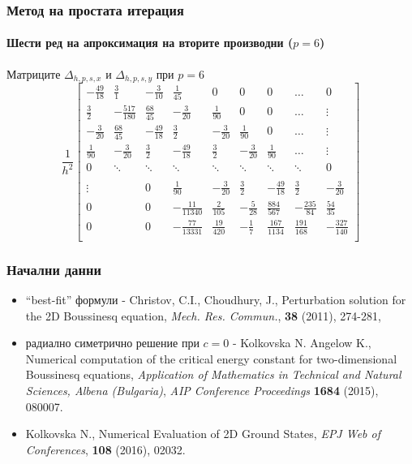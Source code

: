\documentclass{beamer}
\begin{document}
\begin{frame}
\frametitle{Метод на простата итерация}
\framesubtitle{Шести ред на апроксимация на вторите производни ($p=6$) }
Матриците $\Delta_{h,p,s,x}$ и $\Delta_{h,p,s,y}$ при $p=6$
\[
\frac{1}{h^2}
\begin{bmatrix}
   -\frac{49}{18}		& \frac{3}{1}			&   -\frac{3}{10}		& \frac{1}{45}    		 &  0					& 0	   					&    0      	   	&   \dots           & 0    \\
    \frac{3}{2}    	&-\frac{517}{180}    	&    \frac{68}{45}     & -\frac{3}{20}  	 		& \frac{1}{90} 		&  0					 &   0      	   	&   \dots	       & \vdots  \\
    -\frac{3}{20}		& \frac{68}{45}         	& -\frac{49}{18} 	&  \frac{3}{2}		&  -\frac{3}{20}    	 &   \frac{1}{90}    	 &  0			&     \dots         &\vdots    \\
    \frac{1}{90}		& -\frac{3}{20}		& \frac{3}{2}         	& -\frac{49}{18} 	&  \frac{3}{2}		&  -\frac{3}{20}    	 &   \frac{1}{90} &     \dots         &\vdots    \\
        0           		& \ddots        		&         \ddots           	& \ddots        		&    \ddots   		&   \ddots      		 &     \ddots    	&  \ddots          &    0 \\	
\\
   \vdots      		&            		 	&    	0	      		& \frac{1}{90}		& -\frac{3}{20}		& \frac{3}{2}         	& -\frac{49}{18}	&  \frac{3}{2}  &  -\frac{3}{20} \\
    0      			&              	 	&    0      		&   -\frac{11}{11340}	 	&    \frac{2}{105} 	&  -\frac{5}{28} 	& \frac{884}{567} &-\frac{235}{84} &  \frac{54}{35}\\
    0              	& 	          		&    0              	&  -\frac{77}{13331}    		&  \frac{19}{420}&-\frac{1}{7}	 &  \frac{167}{1134} 	& \frac{191}{168}  &  -\frac{327}{140}\\
\end{bmatrix}
\]
\end{frame}

\begin{frame}
\frametitle{Начални данни}
\begin{itemize}
  \item ``best-fit'' формули - Christov, C.I., Choudhury, J., Perturbation solution for the 2D Boussinesq equation, {\it Mech. Res. Commun.}, \textbf{38} (2011), 274-281,
  \item радиално симетрично решение при $c=0$ - Kolkovska N. Angelow K., Numerical computation of the critical energy constant for two-dimensional Boussinesq equations, {\it Application of Mathematics in Technical and Natural Sciences, Albena (Bulgaria)},
\emph{AIP Conference Proceedings}  \textbf{1684} (2015), 080007.
  \item Kolkovska N., Numerical Evaluation of 2D Ground States,
\emph{ EPJ Web of Conferences}, \textbf{108} (2016), 02032.
\end{itemize}


\end{frame}
\end{document}
